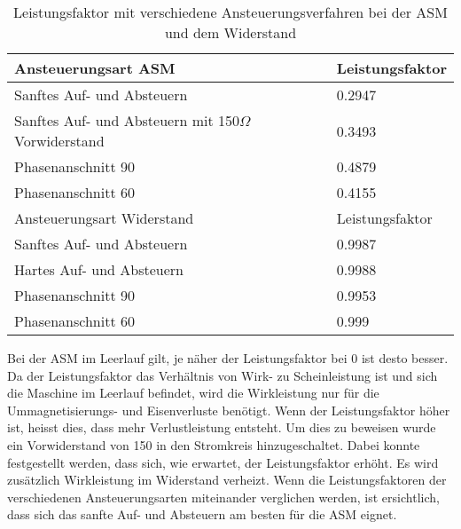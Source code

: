\begin{table}[ht!]
	\centering
	\begin{tabular}{|l|l|}
		\hline
		Ansteuerungsart ASM                                   		& Leistungsfaktor \\ \hline 
		Sanftes Auf- und Absteuern                          		& 0.2947          \\ \hline
		Sanftes Auf- und Absteuern mit 150$\Omega$ Vorwiderstand 	& 0.3493          \\ \hline
		Phasenanschnitt 90\textdegree                               & 0.4879          \\ \hline
		Phasenanschnitt 60\textdegree                               & 0.4155          \\ \hline \hline
		Ansteuerungsart Widerstand                            		& Leistungsfaktor \\ \hline 
		Sanftes Auf- und Absteuern                          		& 0.9987          \\ \hline
		Hartes Auf- und Absteuern                                   & 0.9988          \\ \hline
		Phasenanschnitt 90\textdegree                         		& 0.9953          \\ \hline
		Phasenanschnitt 60\textdegree                         		& 0.999           \\ \hline
	\end{tabular}
\caption{Leistungsfaktor mit verschiedene Ansteuerungsverfahren bei der ASM und dem Widerstand}\label{tab:Leistungsfaktor_ASM_Widerstand}
\end{table}
Bei der ASM im Leerlauf gilt, je näher der Leistungsfaktor bei 0 ist desto besser. Da der Leistungsfaktor das Verhältnis von Wirk- zu Scheinleistung ist und sich die Maschine im Leerlauf befindet, wird die Wirkleistung nur für die Ummagnetisierungs- und Eisenverluste benötigt. Wenn der Leistungsfaktor höher ist, heisst dies, dass mehr Verlustleistung entsteht. Um dies zu beweisen wurde ein Vorwiderstand von \SI{150}{\Omega} in den Stromkreis hinzugeschaltet. Dabei konnte festgestellt werden, dass sich, wie erwartet, der Leistungsfaktor erhöht. Es wird zusätzlich Wirkleistung im Widerstand verheizt. Wenn die Leistungsfaktoren der verschiedenen Ansteuerungsarten miteinander verglichen werden, ist ersichtlich, dass sich das sanfte Auf- und  Absteuern am besten für die ASM eignet.

